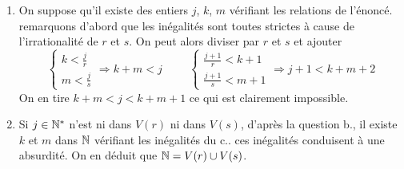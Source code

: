 \begin{enumerate}
\begin{enumerate}
 \item On suppose qu'il existe des entiers $j$, $k$, $m$ vérifiant les relations de l'énoncé. remarquons d'abord que les inégalités sont toutes strictes à cause de l'irrationalité de $r$ et $s$. On peut alors diviser par $r$ et $s$ et ajouter
\begin{displaymath}
 \left\lbrace 
\begin{aligned}
 k < \frac{j}{r} \\ m < \frac{j}{s}
\end{aligned}
\right. \Rightarrow k+m < j
\hspace{1cm}
 \left\lbrace 
\begin{aligned}
 \frac{j+1}{r}<k+1 \\ \frac{j+1}{s}<m+1
\end{aligned}
\right. \Rightarrow  j+1 < k+m+2
\end{displaymath}
On en tire $k+m<j<k+m+1$ ce qui est clairement impossible.
 \item Si $j\in \mathbb{N}^*$ n'est ni dans $V(r)$ ni dans $V(s)$, d'après la question b., il existe $k$ et $m$ dans $\mathbb{N}$ vérifiant les inégalités du c.. ces inégalités conduisent à une absurdité. On en déduit que $\mathbb{N} = V(r)\cup V(s)$. 
\end{enumerate}


\end{enumerate}
